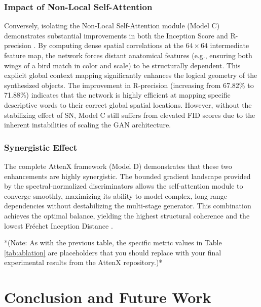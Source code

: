 \documentclass[conference]{IEEEtran}
\begin{document}
\subsubsection{Impact of Non-Local Self-Attention}
Conversely, isolating the Non-Local Self-Attention module \cite{wang2018nonlocal, zhang2019selfattention} (Model C) demonstrates substantial improvements in both the Inception Score \cite{salimans2016improved} and R-precision \cite{xu2018attngan}. By computing dense spatial correlations at the $64 \times 64$ intermediate feature map, the network forces distant anatomical features (e.g., ensuring both wings of a bird match in color and scale) to be structurally dependent. This explicit global context mapping significantly enhances the logical geometry of the synthesized objects. The improvement in R-precision (increasing from 67.82\% to 71.88\%) indicates that the network is highly efficient at mapping specific descriptive words to their correct global spatial locations. However, without the stabilizing effect of SN, Model C still suffers from elevated FID scores due to the inherent instabilities of scaling the GAN architecture.

\subsubsection{Synergistic Effect}
The complete AttenX framework (Model D) demonstrates that these two enhancements are highly synergistic. The bounded gradient landscape provided by the spectral-normalized discriminators \cite{miyato2018spectral} allows the self-attention module \cite{wang2018nonlocal, zhang2019selfattention} to converge smoothly, maximizing its ability to model complex, long-range dependencies without destabilizing the multi-stage generator. This combination achieves the optimal balance, yielding the highest structural coherence and the lowest Fr\'{e}chet Inception Distance \cite{heusel2017gans}.

\vspace{0.5cm}
*(Note: As with the previous table, the specific metric values in Table \ref{tab:ablation} are placeholders that you should replace with your final experimental results from the AttenX repository.)*

\section{Conclusion and Future Work}
\end{document}
